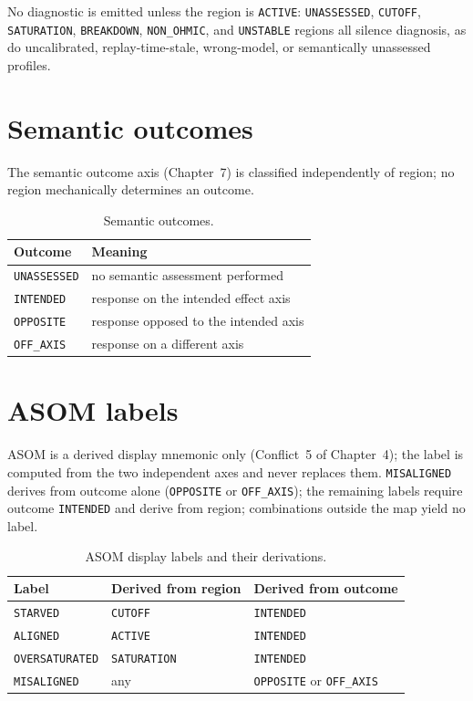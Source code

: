No diagnostic is emitted unless the region is \texttt{ACTIVE}: \texttt{UNASSESSED}, \texttt{CUTOFF}, \texttt{SATURATION}, \texttt{BREAKDOWN}, \texttt{NON\_OHMIC}, and \texttt{UNSTABLE} regions all silence diagnosis, as do uncalibrated, replay-time-stale, wrong-model, or semantically unassessed profiles.

\section{Semantic outcomes}\label{enums:sec:outcomes}

The semantic outcome axis (Chapter~7) is classified independently of region; no region mechanically determines an outcome.

\begin{table}[htbp]
\centering
\caption{Semantic outcomes.}\label{enums:tab:outcomes}
\begin{tabular}{@{}ll@{}}
\toprule
Outcome & Meaning \\
\midrule
\texttt{UNASSESSED} & no semantic assessment performed \\
\texttt{INTENDED} & response on the intended effect axis \\
\texttt{OPPOSITE} & response opposed to the intended axis \\
\texttt{OFF\_AXIS} & response on a different axis \\
\bottomrule
\end{tabular}
\end{table}

\section{ASOM labels}\label{enums:sec:asom}

ASOM is a derived display mnemonic only (Conflict~5 of Chapter~4); the label is computed from the two independent axes and never replaces them. \texttt{MISALIGNED} derives from outcome alone (\texttt{OPPOSITE} or \texttt{OFF\_AXIS}); the remaining labels require outcome \texttt{INTENDED} and derive from region; combinations outside the map yield no label.

\begin{table}[htbp]
\centering
\caption{ASOM display labels and their derivations.}\label{enums:tab:asom}
\begin{tabular}{@{}lll@{}}
\toprule
Label & Derived from region & Derived from outcome \\
\midrule
\texttt{STARVED} & \texttt{CUTOFF} & \texttt{INTENDED} \\
\texttt{ALIGNED} & \texttt{ACTIVE} & \texttt{INTENDED} \\
\texttt{OVERSATURATED} & \texttt{SATURATION} & \texttt{INTENDED} \\
\texttt{MISALIGNED} & any & \texttt{OPPOSITE} or \texttt{OFF\_AXIS} \\
\bottomrule
\end{tabular}
\end{table}


